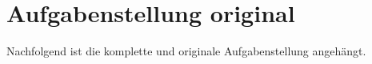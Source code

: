 \section{Aufgabenstellung original}
Nachfolgend ist die komplette und originale Aufgabenstellung angehängt.

